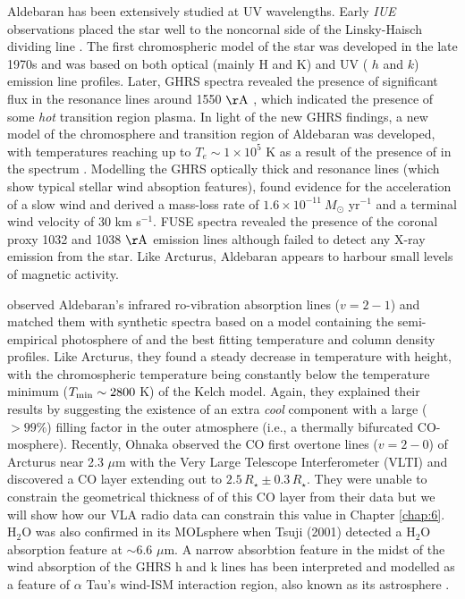 Aldebaran has been extensively studied at UV wavelengths. Early \textit{IUE} observations placed the star well to the noncornal side of the Linsky-Haisch dividing line \citep{linsky_1979}. The first chromospheric model of the star was developed in the late 1970s \citep{kelch_1978} and was based on both optical (mainly  H and K) and UV ( $h$ and $k$) emission line profiles. Later, GHRS spectra revealed the presence of significant flux in the  resonance lines around 1550 $\rm{\AA}$ \citep{carpenter_1996}, which indicated the presence of some \textit{hot} transition region plasma. In light of the new GHRS findings, a new model of the chromosphere and transition region of Aldebaran was developed, with temperatures reaching up to $T_{e} \sim 1\times 10^5$ K as a result of the presence of  in the spectrum \citep{mcmurry_1999}. Modelling the GHRS optically thick  and  resonance lines (which show typical stellar wind absoption features), \cite{robinson_1998} found evidence for the acceleration of a slow wind and derived a mass-loss rate of $1.6\times 10^{-11} \ M_{\odot}$ yr$^{-1}$ and a terminal wind velocity of 30 km s$^{-1}$. FUSE spectra revealed the presence of the coronal proxy  1032 and 1038 $\rm{\AA}$ emission lines \citep{dupree_2005} although \cite{ayres_2003} failed to detect any X-ray emission from the star. Like Arcturus, Aldebaran appears to harbour small levels of magnetic activity.

\cite{wiedemann_1994} observed Aldebaran's infrared ro-vibration absorption lines ($v=2-1$) and matched them with synthetic spectra based on a model containing the semi-empirical photosphere of \cite{kelch_1978} and the best fitting temperature and column density profiles. Like Arcturus, they found a steady decrease in temperature with height, with the chromospheric temperature being constantly below the temperature minimum ($T_{\rm{min}} \sim 2800$ K) of the Kelch model. Again, they explained their results by suggesting the existence of an extra \textit{cool} component with a large ($> 99 \%$) filling factor in the outer atmosphere (i.e., a thermally bifurcated  CO-mosphere). Recently, Ohnaka observed the CO first overtone lines ($v=2-0$) of Arcturus near 2.3 $\mu$m with the Very Large Telescope Interferometer (VLTI) and discovered a CO layer extending out to $2.5\,R_{\star} \pm 0.3\,R_{\star}$. They were unable to constrain the geometrical thickness of of this CO layer from their data but we will show how our VLA radio data can constrain this value in Chapter \ref{chap:6}. H$_{2}$O was also confirmed in its MOLsphere  when Tsuji (2001) detected a H$_{2}$O absorption feature at $\sim6.6$ $\mu$m. A narrow absorbtion feature in the midst of the wind absorption of the GHRS  h  and k  lines has been interpreted and modelled as a feature of $\alpha$ Tau's wind-ISM interaction region, also known as its astrosphere \citep{wood_2007}. 

